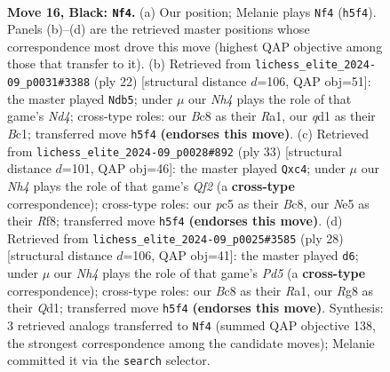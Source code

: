 \documentclass[11pt]{article}
\begin{document}
\clearpage

\begin{figure}[p]\centering
\begin{subfigure}{0.46\textwidth}\centering
\resizebox{\linewidth}{!}{%
\newchessgame
\chessboard[
  setfen={r1b2kr1/1p1qbp1p/p5p1/2Ppn2n/8/1N4N1/PP1K1PPP/1RBQ1B1R b - - 1 16},
  showmover=false,
  pgfstyle=straightmove, color=movearrow, markmove={h5-f4}
]}
\caption{}
\end{subfigure}\hfill
\begin{subfigure}{0.46\textwidth}\centering
\resizebox{\linewidth}{!}{%
\newchessgame
\chessboard[
  setfen={r1bqr1k1/pp3pbp/2np1np1/8/3NP3/2N4P/PPB2PP1/R1BQ1RK1 w - - 3 12},
  showmover=false,
  pgfstyle=straightmove, color=movearrow, markmove={d4-b5}
]}
\caption{}
\end{subfigure}
\\[4pt]
\begin{subfigure}{0.46\textwidth}\centering
\resizebox{\linewidth}{!}{%
\newchessgame
\chessboard[
  setfen={r1b2r2/pp1n1qbk/2p3pp/4p3/2PnN3/2B1RNPP/PP3PB1/R2Q2K1 b - - 3 17},
  showmover=false,
  pgfstyle=straightmove, color=movearrow, markmove={f7-c4}
]}
\caption{}
\end{subfigure}\hfill
\begin{subfigure}{0.46\textwidth}\centering
\resizebox{\linewidth}{!}{%
\newchessgame
\chessboard[
  setfen={rb1qk2r/pp1b2pp/n4n2/1N1P1p2/2BPp3/PP6/1B1N1PPP/R2QK2R w KQkq - 3 15},
  showmover=false,
  pgfstyle=straightmove, color=movearrow, markmove={d5-d6}
]}
\caption{}
\end{subfigure}
\caption{\textbf{Move 16, Black: \texttt{Nf4}.} (a) Our position; Melanie plays \texttt{Nf4} (\texttt{h5f4}). Panels (b)--(d) are the retrieved master positions whose correspondence most drove this move (highest QAP objective among those that transfer to it). (b) Retrieved from \texttt{lichess\_elite\_2024-09\_p0031\#3388} (ply 22) [structural distance $d$=106, QAP obj=51]: the master played \texttt{Ndb5}; under $\mu$ our \emph{Nh4} plays the role of that game's \emph{Nd4}; cross-type roles: our \emph{B}c8 as their \emph{R}a1, our \emph{q}d1 as their \emph{B}c1; transferred move \texttt{h5f4} \textbf{(endorses this move)}. (c) Retrieved from \texttt{lichess\_elite\_2024-09\_p0028\#892} (ply 33) [structural distance $d$=101, QAP obj=46]: the master played \texttt{Qxc4}; under $\mu$ our \emph{Nh4} plays the role of that game's \emph{Qf2} (a \textbf{cross-type} correspondence); cross-type roles: our \emph{p}c5 as their \emph{B}c8, our \emph{N}e5 as their \emph{R}f8; transferred move \texttt{h5f4} \textbf{(endorses this move)}. (d) Retrieved from \texttt{lichess\_elite\_2024-09\_p0025\#3585} (ply 28) [structural distance $d$=106, QAP obj=41]: the master played \texttt{d6}; under $\mu$ our \emph{Nh4} plays the role of that game's \emph{Pd5} (a \textbf{cross-type} correspondence); cross-type roles: our \emph{B}c8 as their \emph{R}a1, our \emph{R}g8 as their \emph{Q}d1; transferred move \texttt{h5f4} \textbf{(endorses this move)}. Synthesis: 3 retrieved analogs transferred to \texttt{Nf4} (summed QAP objective 138, the strongest correspondence among the candidate moves); Melanie committed it via the \texttt{search} selector.}

\end{figure}
\end{document}
